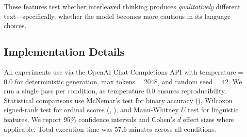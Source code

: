 These features test whether interleaved thinking produces \emph{qualitatively} different text---specifically, whether the model becomes more cautious in its language choices.

\subsection{Implementation Details}
\label{sec:implementation}

All experiments use \gptfour via the OpenAI Chat Completions API with temperature$=$0.0 for deterministic generation, max tokens$=$2048, and random seed$=$42. We run a single pass per condition, as temperature 0.0 ensures reproducibility. Statistical comparisons use McNemar's test for binary accuracy (\gsm), Wilcoxon signed-rank test for ordinal scores (\tqa, \mtbench), and Mann-Whitney $U$ test for linguistic features. We report 95\% confidence intervals and Cohen's $d$ effect sizes where applicable. Total execution time was 57.6 minutes across all conditions.
